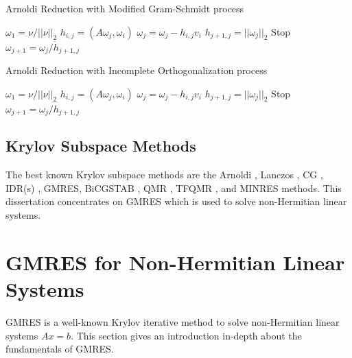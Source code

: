 \begin{algorithm}[t]{}
	\caption{Arnoldi Reduction with Modified Gram-Schmidt process}   
	\label{alg:arnoldi-reduction-md}   
	\begin{algorithmic}[1]
		\State $\omega_1=\nu /||\nu||_2$
		\State $h_{i,j}=(A\omega_j,\omega_i)$
		\State $\omega_j=\omega_j-h_{i,j}v_i$
		\EndFor
		\State $h_{j+1,j}=||\omega_j||_2$
		 Stop
		\EndIf
		\State $\omega_{j+1}=\omega_j/h_{j+1,j}$
		\EndFor 
		\EndFunction
	\end{algorithmic}  
\end{algorithm}

\begin{algorithm}[t]{}
	\caption{Arnoldi Reduction with Incomplete Orthogonalization process}   
	\label{alg:arnoldi-incomplete-reduction}   
	\begin{algorithmic}[1]
		\State $\omega_1=\nu /||\nu||_2$
		\State $h_{i,j}=(A\omega_j,\omega_i)$
		\State $\omega_j=\omega_j-h_{i,j}v_i$
		\EndFor
		\State $h_{j+1,j}=||\omega_j||_2$
		 Stop
		\EndIf
		\State $\omega_{j+1}=\omega_j/h_{j+1,j}$
		\EndFor 
		\EndFunction
	\end{algorithmic}  
\end{algorithm}

\subsection{Krylov Subspace Methods}

The best known Krylov subspace methods are the Arnoldi \cite{voss2004arnoldi}, Lanczos \cite{widlund1978lanczos}, CG \cite{lasdon1967conjugate}, IDR(s) \cite{van2015induced}, GMRES, BiCGSTAB \cite{sleijpen1993bicgstab}, QMR \cite{freund1991qmr}, TFQMR \cite{basermann1996qmr}, and MINRES \cite{paige1975solution} methods. This dissertation concentrates on GMRES which is used to solve non-Hermitian linear systems.

\section{GMRES for Non-Hermitian Linear Systems}

GMRES is a well-known Krylov iterative method to solve non-Hermitian linear systems $Ax=b$. This section gives an introduction in-depth about the fundamentals of GMRES.

